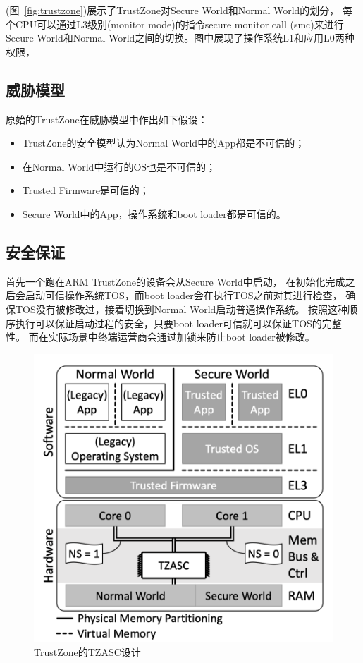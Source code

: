 (图~\ref{fig:trustzone})展示了TrustZone对Secure World和Normal World的划分，
每个CPU可以通过L3级别(monitor mode)的指令secure monitor call (smc)来进行
Secure World和Normal World之间的切换。图中展现了操作系统L1和应用L0两种权限，


\subsection {威胁模型} 
原始的TrustZone在威胁模型中作出如下假设：
\begin{itemize}
    \item
    TrustZone的安全模型认为Normal World中的App都是不可信的；
    \item
    在Normal World中运行的OS也是不可信的；
    \item 
    Trusted Firmware是可信的；
    \item
    Secure World中的App，操作系统和boot loader都是可信的。
\end{itemize}

\subsection{安全保证}
首先一个跑在ARM TrustZone的设备会从Secure World中启动，
在初始化完成之后会启动可信操作系统TOS，而boot loader会在执行TOS之前对其进行检查，
确保TOS没有被修改过，接着切换到Normal World启动普通操作系统。
按照这种顺序执行可以保证启动过程的安全，只要boot loader可信就可以保证TOS的完整性。
而在实际场景中终端运营商会通过加锁来防止boot loader被修改。

\begin{figure}
    \centering
    \includegraphics[scale=0.6]{Figures/trustzone/TZASC.png}
    \decoRule
    \caption{TrustZone的TZASC设计}
    \label{fig:tzasc}
\end{figure}
    
